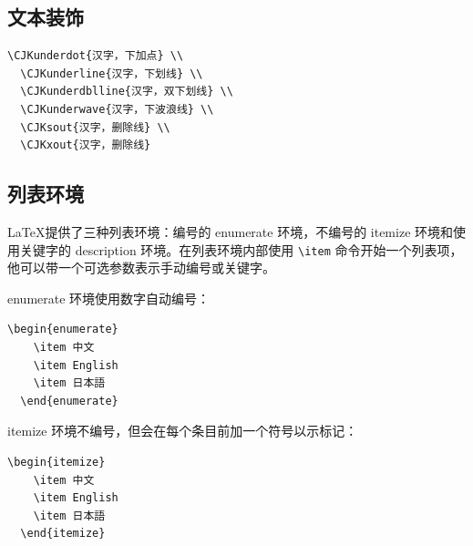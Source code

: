 \subsection{文本装饰}
\begin{lstlisting}[caption=文本装饰]
  \CJKunderdot{汉字，下加点} \\
  \CJKunderline{汉字，下划线} \\
  \CJKunderdblline{汉字，双下划线} \\
  \CJKunderwave{汉字，下波浪线} \\
  \CJKsout{汉字，删除线} \\
  \CJKxout{汉字，删除线}
\end{lstlisting}
\begin{center}
\end{center}

\subsection{列表环境}
\LaTeX 提供了三种列表环境：编号的 enumerate 环境，不编号的 itemize 环境和使用关键字的 description 环境。在列表环境内部使用 \verb|\item| 命令开始一个列表项，他可以带一个可选参数表示手动编号或关键字。

enumerate 环境使用数字自动编号：
\clearpage
\begin{lstlisting}[caption=enumerate环境]
  \begin{enumerate}
    \item 中文
    \item English
    \item 日本語
  \end{enumerate}
\end{lstlisting}

\begin{center}
\end{center}
itemize 环境不编号，但会在每个条目前加一个符号以示标记：
\begin{lstlisting}[caption=enumerate环境]
  \begin{itemize}
    \item 中文
    \item English
    \item 日本語
  \end{itemize}
\end{lstlisting}


